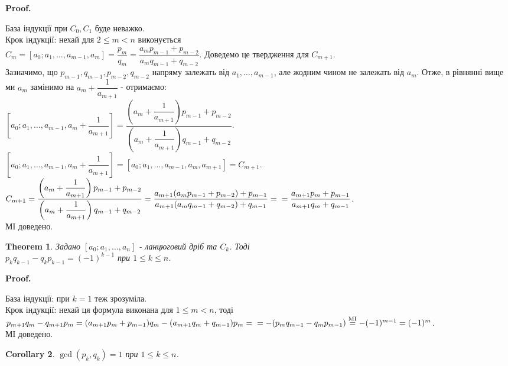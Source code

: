 \documentclass[a4paper, 14pt]{extarticle}
\makeatletter
\theoremstyle{theoremdd}
\newtheorem{theorem}{Theorem}[subsection]
\theoremstyle{theoremdd}
\theoremstyle{theoremdd}
\theoremstyle{theoremdd}
\theoremstyle{theoremdd}
\theoremstyle{theoremdd}
\theoremstyle{theoremdd}
\theoremstyle{theoremdd}
\newtheorem{corollary}[theorem]{Corollary}
\def\qed{$\blacksquare$}
\renewenvironment{proof}[1][Proof.\\]{\par
\pushQED{\hfill \qed}%
\normalfont \topsep6\p@\@plus6\p@\relax
\trivlist
\item\relax
{\bfseries
#1\@addpunct{.}}\hspace\labelsep\ignorespaces
}{%
\popQED\endtrivlist\@endpefalse
}
\makeatother
\begin{document}
\begin{proof}
База індукції при $C_0,C_1$ буде неважко.\\
Крок індукції: нехай для $2 \leq m < n$ виконується \\ $C_m = [a_0;a_1,\dots,a_{m-1},a_m] =\dfrac{p_m}{q_m} = \dfrac{a_m p_{m-1} + p_{m-2}}{a_m q_{m-1} + q_{m-2}}$. Доведемо це твердження для $C_{m+1}$.\\
Зазначимо, що $p_{m-1},q_{m-1},p_{m-2},q_{m-2}$ напряму залежать від $a_1,\dots,a_{m-1}$, але жодним чином не залежать від $a_m$. Отже, в рівнянні вище ми $a_m$ замінимо на $a_m + \dfrac{1}{a_{m+1}}$ - отримаємо:\\
$\left[a_0;a_1,\dots,a_{m-1},a_m+\dfrac{1}{a_{m+1}} \right] = \dfrac{\left( a_m + \dfrac{1}{a_{m+1}} \right)p_{m-1} + p_{m-2}}{\left( a_m + \dfrac{1}{a_{m+1}} \right)q_{m-1} + q_{m-2}}$.\\
$\left[a_0;a_1,\dots,a_{m-1},a_m + \dfrac{1}{a_{m+1}}\right] = [a_0;a_1,\dots,a_{m-1},a_m,a_{m+1}] = C_{m+1}$.\\
$C_{m+1} = \dfrac{\left( a_m + \dfrac{1}{a_{m+1}} \right)p_{m-1} + p_{m-2}}{\left( a_m + \dfrac{1}{a_{m+1}} \right)q_{m-1} + q_{m-2}} = \dfrac{a_{m+1}(a_m p_{m-1}+p_{m-2}) + p_{m-1}}{a_{m+1}(a_m q_{m-1} + q_{m-2}) + q_{m-1}} = \\ = \dfrac{a_{m+1}p_m + p_{m-1}}{a_{m+1}q_m + q_{m-1}}$.\\
МІ доведено.
\end{proof}

\begin{theorem}
\label{p_k q_k-1 - q_k p_k-1 = (-1)^k-1}
Задано $[a_0;a_1,\dots,a_n]$ - ланцюговий дріб та $C_k$. Тоді \\ $p_k q_{k-1} - q_k p_{k-1} = (-1)^{k-1}$ при $1 \leq k \leq n$.
\end{theorem}

\begin{proof}
База індукції: при $k = 1$ теж зрозуміла.\\
Крок індукції: нехай ця формула виконана для $1 \leq m < n$, тоді\\
$p_{m+1}q_m - q_{m+1}p_m = (a_{m+1}p_m + p_{m-1})q_m - (a_{m+1}q_m + q_{m-1})p_m = \\ = - (p_mq_{m-1}-q_mp_{m-1}) \overset{\text{MI}}{=} -(-1)^{m-1} = (-1)^m$.\\
МІ доведено.
\end{proof}

\begin{corollary}
$\gcd(p_k,q_k) = 1$ при $1 \leq k \leq n$.
\end{corollary}
\end{document}
